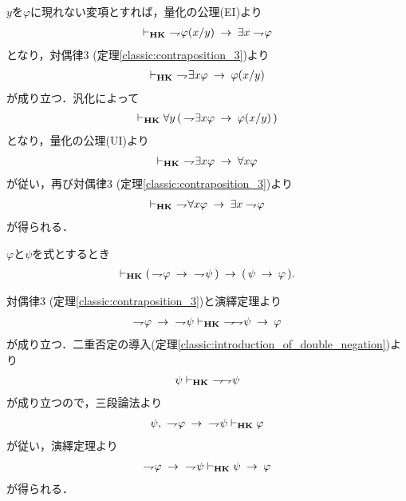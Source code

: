 	\begin{sketch}
		$y$を$\varphi$に現れない変項とすれば，量化の公理(EI)より
		\begin{align}
			\vdash_{{\scriptsize \mbox{{\bf HK}}}}\ \rightharpoondown\hspace{-0.25em} \varphi(x/y) \hspace{0.25em}\rightarrow\hspace{0.25em} \exists x \rightharpoondown\hspace{-0.25em} \varphi
		\end{align}
		となり，対偶律3 (定理\ref{classic:contraposition_3})より
		\begin{align}
			\provable{\mbox{{\bf HK}}}\ 
			\negation \exists x \varphi \rarrow \varphi(x/y)
		\end{align}
		が成り立つ．汎化によって
		\begin{align}
			\vdash_{{\scriptsize \mbox{{\bf HK}}}}
			\forall y\, (\, \rightharpoondown\hspace{-0.25em} \exists x \varphi \hspace{0.25em}\rightarrow\hspace{0.25em} \varphi(x/y)\, )
		\end{align}
		となり，量化の公理(UI)より
		\begin{align}
			\provable{\mbox{{\bf HK}}}\ 
			\negation \exists x \varphi \rarrow \forall x \varphi
		\end{align}
		が従い，再び対偶律3 (定理\ref{classic:contraposition_3})より
		\begin{align}
			\vdash_{{\scriptsize \mbox{{\bf HK}}}}\ \rightharpoondown\hspace{-0.25em} \forall x \varphi \hspace{0.25em}\rightarrow\hspace{0.25em} \exists x \rightharpoondown\hspace{-0.25em} \varphi
		\end{align}
		が得られる．
		\QED
	\end{sketch}
	
	\begin{screen}
		\begin{thm}[対偶律4]\label{classic:contraposition_4}
			$\varphi$と$\psi$を式とするとき
			\begin{align}
				\vdash_{{\scriptsize \mbox{{\bf HK}}}} (\, \rightharpoondown\hspace{-0.25em} \varphi \hspace{0.25em}\rightarrow\hspace{0.25em}\ \rightharpoondown\hspace{-0.25em} \psi\, )
				\hspace{0.25em}\rightarrow\hspace{0.25em} (\, \psi \hspace{0.25em}\rightarrow\hspace{0.25em} \varphi\, ).
			\end{align}
		\end{thm}
	\end{screen}
	
	\begin{sketch}
		対偶律3 (定理\ref{classic:contraposition_3})と演繹定理より
		\begin{align}
			\negation \varphi \rarrow\ \negation \psi \provable{\mbox{{\bf HK}}}\ 
			\negation \negation \psi \rarrow \varphi
		\end{align}
		が成り立つ．二重否定の導入(定理\ref{classic:introduction_of_double_negation})より
		\begin{align}
			\psi \vdash_{{\scriptsize \mbox{{\bf HK}}}}\ \rightharpoondown\hspace{-0.25em} \rightharpoondown\hspace{-0.25em} \psi
		\end{align}
		が成り立つので，三段論法より
		\begin{align}
			\psi,\ \rightharpoondown\hspace{-0.25em} \varphi \hspace{0.25em}\rightarrow\hspace{0.25em}\ \rightharpoondown\hspace{-0.25em} \psi \vdash_{{\scriptsize \mbox{{\bf HK}}}} \varphi
		\end{align}
		が従い，演繹定理より
		\begin{align}
			\rightharpoondown\hspace{-0.25em} \varphi \hspace{0.25em}\rightarrow\hspace{0.25em}\ \rightharpoondown\hspace{-0.25em} \psi \vdash_{{\scriptsize \mbox{{\bf HK}}}} 
			\psi \hspace{0.25em}\rightarrow\hspace{0.25em} \varphi
		\end{align}
		が得られる．
		\QED
	\end{sketch}
	
